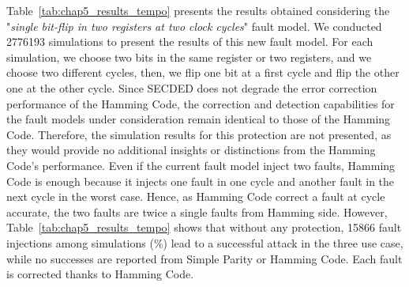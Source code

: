 Table~\ref{tab:chap5_results_tempo} presents the results obtained considering the "\textit{single bit-flip in two registers at two clock cycles}" fault model. We conducted \num{2776193} simulations to present the results of this new fault model. For each simulation, we choose two bits in the same register or two registers, and we choose two different cycles, then, we flip one bit at a first cycle and flip the other one at the other cycle. Since SECDED does not degrade the error correction performance of the Hamming Code, the correction and detection capabilities for the fault models under consideration remain identical to those of the Hamming Code. Therefore, the simulation results for this protection are not presented, as they would provide no additional insights or distinctions from the Hamming Code's performance.
Even if the current fault model inject two faults, Hamming Code is enough because it injects one fault in one cycle and another fault in the next cycle in the worst case. Hence, as Hamming Code correct a fault at cycle accurate, the two faults are twice a single faults from Hamming side.
However, Table~\ref{tab:chap5_results_tempo} shows that without any protection, \num{15866} fault injections among  simulations (\%) lead to a successful attack in the three use case, while no successes are reported from Simple Parity or Hamming Code. Each fault is corrected thanks to Hamming Code.


